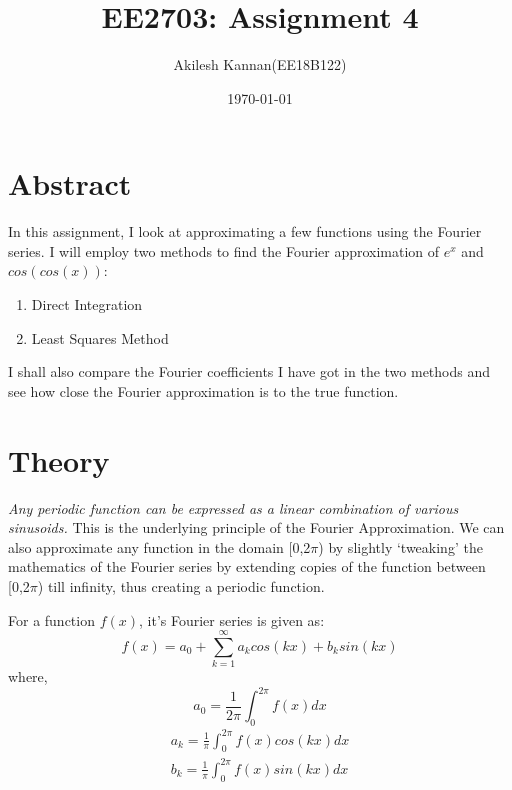 \documentclass[11pt, a4paper, twoside]{article}
\title{EE2703: Assignment 4}
\author{Akilesh Kannan(EE18B122)}
\date{\today}
\begin{document}
    \maketitle
    \section{Abstract}
         In this assignment, I look at approximating a few functions using the Fourier series. I will employ two methods to find the Fourier approximation of $e^x$ and $cos(cos(x))$: \begin{enumerate}[label=\textbf{(\alph*)}, noitemsep, topsep=0pt]
            \item Direct Integration
            \item Least Squares Method
        \end{enumerate}

        I shall also compare the Fourier coefficients I have got in the two methods and see how close the Fourier approximation is to the true function.

    \section{Theory}
        \textit{Any periodic function can be expressed as a linear combination of various sinusoids.} This is the underlying principle of the Fourier Approximation. We can also approximate any function in the domain [0,2$\pi$) by slightly `tweaking' the mathematics of the Fourier series by extending copies of the function between [0,2$\pi$) till infinity, thus creating a periodic function.

        For a function $f(x)$, it's Fourier series is given as:
        \begin{equation}
            f(x) = a_0 + \sum_{k=1}^{\infty}a_kcos(kx) + b_ksin(kx)
        \end{equation}
        where,
        \begin{equation}
            a_0 = \frac{1}{2\pi}\int_{0}^{2\pi}f(x)dx
        \end{equation}
        \begin{equation}
            \begin{split}
                a_k = \frac{1}{\pi}\int_{0}^{2\pi}f(x)cos(kx)dx\\
                b_k = \frac{1}{\pi}\int_{0}^{2\pi}f(x)sin(kx)dx
            \end{split}
        \end{equation}
\end{document}
